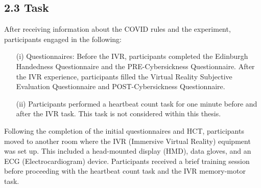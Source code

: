 \documentclass[12pt,oneside,openright]{report}
\begin{document}
\subsection*{2.3 Task}
After receiving information about the COVID rules and the experiment, participants engaged in the following:
\begin{enumerate}
\item[(i)] Questionnaires: Before the IVR, participants completed the Edinburgh Handedness Questionnaire and the PRE-Cybersickness Questionnaire. After the IVR experience, participants filled the Virtual Reality Subjective Evaluation Questionnaire and POST-Cybersickness Questionnaire.

\item[(ii)] Participants performed a heartbeat count task for one minute before and after the IVR task. This task is not considered within this thesis.
\end{enumerate}

Following the completion of the initial questionnaires and HCT, participants moved to another room where the IVR (Immersive Virtual Reality) equipment was set up. This included a head-mounted display (HMD), data gloves, and an ECG (Electrocardiogram) device. Participants received a brief training session before proceeding with the heartbeat count task and the IVR memory-motor task.
\end{document}
